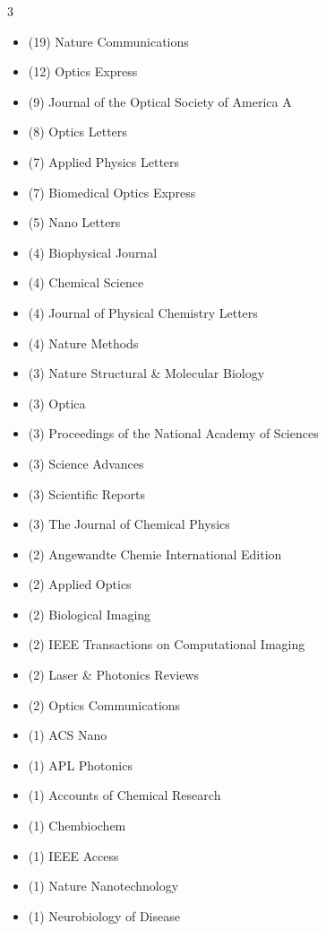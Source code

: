 \begin{multicols}{3}
{\RaggedRight
\begin{itemize}
    \item (19) Nature Communications
    \item (12) Optics Express
    \item (9) Journal of the Optical Society of America A
    \item (8) Optics Letters
    \item (7) Applied Physics Letters
    \item (7) Biomedical Optics Express
    \item (5) Nano Letters
    \item (4) Biophysical Journal
    \item (4) Chemical Science
    \item (4) Journal of Physical Chemistry Letters
    \item (4) Nature Methods
    \item (3) Nature Structural \& Molecular Biology
    \item (3) Optica
    \item (3) Proceedings of the National Academy of Sciences
    \item (3) Science Advances
    \item (3) Scientific Reports
    \item (3) The Journal of Chemical Physics
    \item (2) Angewandte Chemie International Edition
    \item (2) Applied Optics
    \item (2) Biological Imaging
    \item (2) IEEE Transactions on Computational Imaging
    \item (2) Laser \& Photonics Reviews
    \item (2) Optics Communications
    \item (1) ACS Nano
    \item (1) APL Photonics
    \item (1) Accounts of Chemical Research
    \item (1) Chembiochem
    \item (1) IEEE Access
    \item (1) Nature Nanotechnology
    \item (1) Neurobiology of Disease
\end{itemize}
\par}
\end{multicols}

